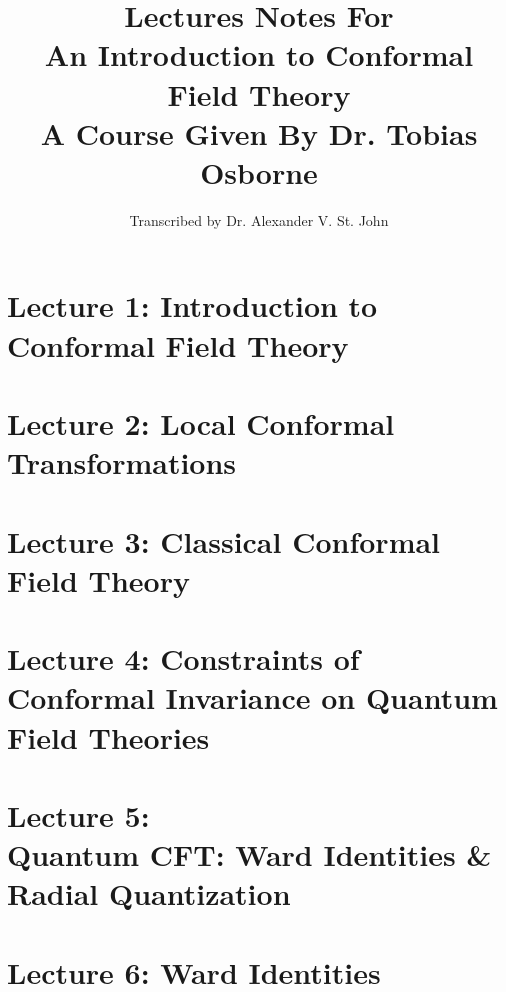 \documentclass[10pt]{article}
\title{Lectures Notes For \\ An Introduction to Conformal Field Theory \\ A Course Given By Dr. Tobias Osborne}
\author{Transcribed by Dr. Alexander V. St. John}
\begin{document}
\maketitle

\clearpage

\section*{Lecture 1: Introduction to Conformal Field Theory}
\label{sec: lec1}



\clearpage

\section*{Lecture 2: Local Conformal Transformations}
\label{sec: lec2}



\clearpage

\section*{Lecture 3: Classical Conformal Field Theory}
\label{sec: lec3}



\clearpage

\section*{Lecture 4: Constraints of Conformal Invariance on Quantum Field Theories}
\label{sec: lec4}



\clearpage

\section*{Lecture 5: \\ Quantum CFT: Ward Identities \& Radial Quantization}
\label{sec: lec5}



\clearpage

\section*{Lecture 6: Ward Identities}
\label{sec: lec6}


\end{document}
